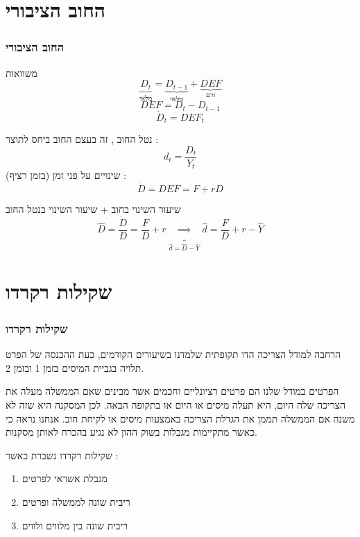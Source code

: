 \documentclass[usenames,dvipsnames,10pt]{beamer}
\begin{document}
\begin{RTL}
\section{החוב הציבורי}
\begin{frame}[allowframebreaks]
    \frametitle{החוב הציבורי}
    \begin{block}{משוואות}
        \begin{equation*}
            \underbrace{D_t}_{\text{מלאי}} = \underbrace{D_{t-1}}_{\text{מלאי}} + \underbrace{DEF}_{\text{זרם}}
        \end{equation*}
        \begin{equation*}
            DEF = D_t - D_{t-1}
        \end{equation*}
        \begin{equation*}
            \dot D_t = DEF_t
        \end{equation*}
    \end{block}

    נטל החוב , זה בעצם החוב ביחס לתוצר :
    \[d_t = \frac{D_t}{Y_t}\]
    שינויים על פני זמן (בזמן רציף) : 
    \[\dot D = DEF  = F + rD\]
    \begin{block}{שיעור השינוי בחוב + שיעור השינוי בנטל החוב }
    \[\widehat D = \frac{\dot D }{D } = \frac{F}{D} + r  \underbrace{\implies}_{\widehat d = \widehat D - \widehat Y} \widehat d  = \frac{F}{D} + r - \widehat{Y} \]
        
    \end{block}
\end{frame}
\section{שקילות רקרדו}
\begin{frame}[allowframebreaks]
    \frametitle{שקילות רקרדו}
    הרחבה למודל הצריכה הדו תקופתית שלמדנו בשיעורים הקודמים, כעת ההכנסה של הפרט תלויה
בגביית המיסים בזמן 1 ובזמן 2.

הפרטים במודל שלנו הם פרטים רציונליים וחכמים אשר מבינים
שאם הממשלה מעלה את הצריכה שלה היום, היא תעלה מיסים או היום או בתקופה הבאה. לכן
המסקנה היא שזה לא משנה אם הממשלה תממן את הגדלת הצריכה באמצעות מיסים או לקיחת
חוב. אנחנו נראה כי כאשר מתקיימות מגבלות בשוק ההון לא נגיע בהכרח לאותן מסקנות.
    
\framebreak
\begin{alertblock}{שקילות רקרדו נשברת כאשר : }
    
\begin{enumerate}
    \item מגבלת אשראי לפרטים
    \item ריבית שונה לממשלה ופרטים
    \item ריבית שונה בין מלווים ולווים
\end{enumerate}
\end{alertblock}


\end{frame}
\end{RTL}
\end{document}
